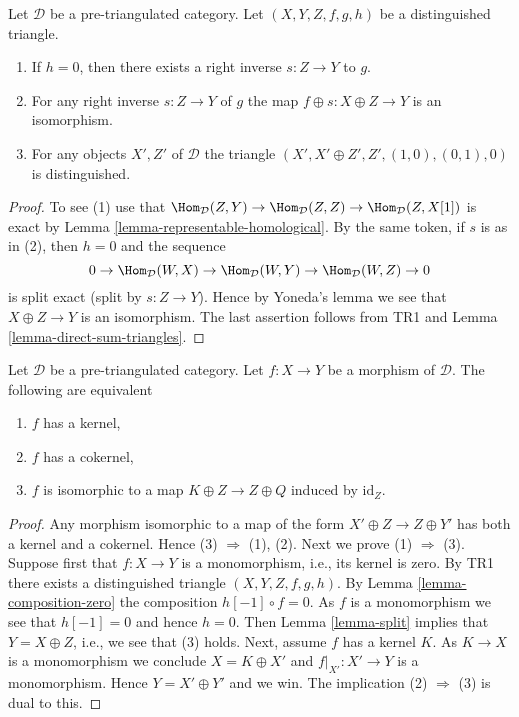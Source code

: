 \begin{lemma}
\label{lemma-split}
Let $\mathcal{D}$ be a pre-triangulated category.
Let $(X, Y, Z, f, g, h)$ be a distinguished triangle.
\begin{enumerate}
\item If $h = 0$, then there exists a right inverse $s : Z \to Y$ to $g$.
\item For any right inverse $s : Z \to Y$ of $g$ the map
$f \oplus s : X \oplus Z \to Y$ is an isomorphism.
\item For any objects $X', Z'$ of $\mathcal{D}$ the triangle
$(X', X' \oplus Z', Z', (1, 0), (0, 1), 0)$ is distinguished.
\end{enumerate}
\end{lemma}

\begin{proof}
To see (1) use that
$\Hom_\mathcal{D}(Z, Y) \to \Hom_\mathcal{D}(Z, Z) \to
\Hom_\mathcal{D}(Z, X[1])$
is exact by
Lemma \ref{lemma-representable-homological}.
By the same token, if $s$ is as in (2), then $h = 0$ and the sequence
$$
0 \to \Hom_\mathcal{D}(W, X) \to \Hom_\mathcal{D}(W, Y)
\to \Hom_\mathcal{D}(W, Z) \to 0
$$
is split exact (split by $s : Z \to Y$). Hence by Yoneda's lemma we
see that $X \oplus Z \to Y$ is an isomorphism. The last assertion follows
from TR1 and
Lemma \ref{lemma-direct-sum-triangles}.
\end{proof}

\begin{lemma}
\label{lemma-when-split}
Let $\mathcal{D}$ be a pre-triangulated category.
Let $f : X \to Y$ be a morphism of $\mathcal{D}$.
The following are equivalent
\begin{enumerate}
\item $f$ has a kernel,
\item $f$ has a cokernel,
\item $f$ is isomorphic to a map $K \oplus Z \to Z \oplus Q$
induced by $\text{id}_Z$.
\end{enumerate}
\end{lemma}

\begin{proof}
Any morphism isomorphic to a map of the form
$X' \oplus Z \to Z \oplus Y'$ has both a kernel and a cokernel.
Hence (3) $\Rightarrow$ (1), (2).
Next we prove (1) $\Rightarrow$ (3).
Suppose first that $f : X \to Y$ is a monomorphism, i.e., its kernel is zero.
By TR1 there exists a distinguished triangle $(X, Y, Z, f, g, h)$.
By Lemma \ref{lemma-composition-zero} the composition
$h[-1] \circ f = 0$. As $f$ is a monomorphism we see that $h[-1] = 0$
and hence $h = 0$. Then
Lemma \ref{lemma-split}
implies that $Y = X \oplus Z$, i.e., we see that (3) holds.
Next, assume $f$ has a kernel $K$. As $K \to X$ is a monomorphism we
conclude $X = K \oplus X'$ and $f|_{X'} : X' \to Y$ is a monomorphism.
Hence $Y = X' \oplus Y'$ and we win.
The implication (2) $\Rightarrow$ (3) is dual to this.
\end{proof}

